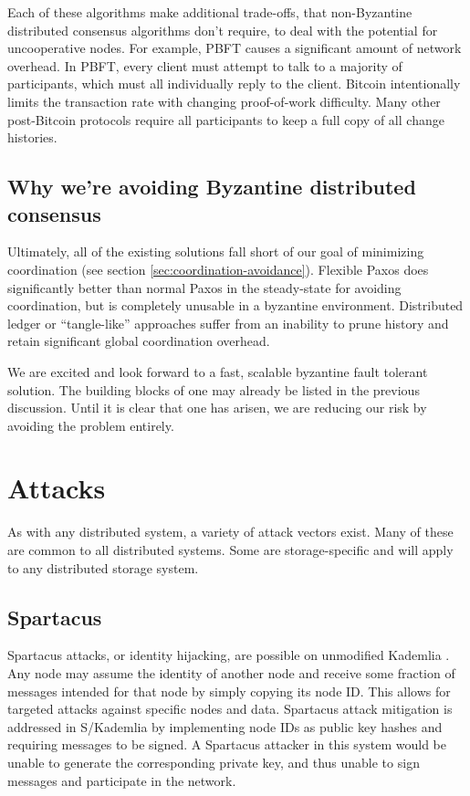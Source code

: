 \documentclass[8pt,fleqn,openany]{book}
\begin{document}
Each of these algorithms make
additional trade-offs, that non-Byzantine distributed consensus algorithms don't
require, to deal with the potential for uncooperative nodes. For example,
PBFT \cite{pbft} causes a significant amount of network overhead. In PBFT, every
client must attempt to talk to a majority of participants, which must all
individually reply to the client. Bitcoin
\cite{bitcoin} intentionally limits the transaction rate with changing
proof-of-work difficulty. Many other post-Bitcoin protocols require all
participants to keep a full copy of all change histories.

\section{Why we're avoiding Byzantine distributed consensus}

Ultimately, all of the existing solutions fall short of our goal of minimizing
coordination (see section \ref{sec:coordination-avoidance}). Flexible Paxos
\cite{paxos-flexible} does significantly better than normal Paxos in the
steady-state for avoiding coordination, but is completely unusable in a
byzantine environment. Distributed ledger or ``tangle-like'' approaches suffer
from an inability to prune history and retain significant global coordination
overhead.

We are excited and look forward to a fast, scalable byzantine fault tolerant
solution. The building blocks of one may already be listed in the previous
discussion. Until it is clear that one has arisen, we are reducing our risk
by avoiding the problem entirely.

\chapter{Attacks}

As with any distributed system, a variety of attack vectors exist. Many of these
are common to all distributed systems. Some are storage-specific and will apply
to any distributed storage system.

\section{Spartacus}

Spartacus attacks, or identity hijacking, are possible on unmodified Kademlia
\cite{kad}.
Any node may assume the identity of another node and receive some fraction of
messages intended for that node by simply copying its node ID.
This allows for targeted attacks against specific nodes and data.
Spartacus attack mitigation is addressed in S/Kademlia \cite{skad} by
implementing node IDs as public key hashes and requiring messages to be signed.
A Spartacus attacker in this system would be unable to generate the
corresponding private key, and thus unable to sign messages and participate in
the network.
\end{document}
